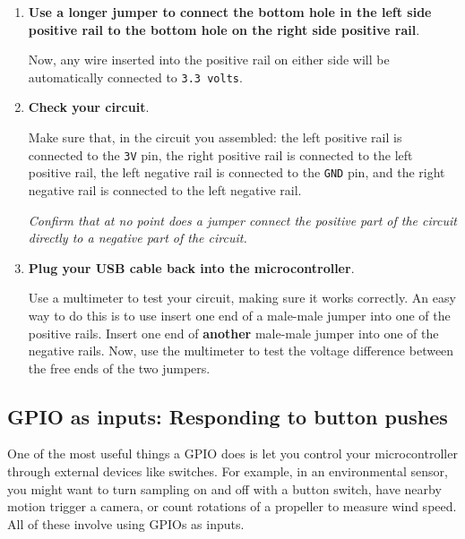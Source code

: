 \begin{enumerate}
	\item \textbf{Use a longer jumper to connect the bottom hole in the left side positive rail to the bottom hole on the right side positive rail}. 
	
	Now, any wire inserted into the positive rail on either side will be automatically connected to \texttt{3.3 volts}.
	
	\item \textbf{Check your circuit}.

	Make sure that, in the circuit you assembled: the left positive rail is connected to the \texttt{3V} pin, the right positive rail is connected to the left positive rail, the left negative rail is connected to the \texttt{GND} pin, and the right negative rail is connected to the left negative rail.
	
	\emph{Confirm that at no point does a jumper connect the positive part of the circuit directly to a negative part of the circuit.}

	\item \textbf{Plug your USB cable back into the microcontroller}.
	
	Use a multimeter to test your circuit, making sure it works correctly. 
	An easy way to do this is to use insert one end of a male-male jumper into one of the positive rails. 
	Insert one end of \textbf{another} male-male jumper into one of the negative rails. 
	Now, use the multimeter to test the voltage difference between the free ends of the two jumpers.
	
\end{enumerate}

\subsection{GPIO as inputs: Responding to button pushes}
One of the most useful things a GPIO does is let you control your microcontroller through external devices like switches. 
For example, in an environmental sensor, you might want to turn sampling on and off with a button switch, have nearby motion trigger a camera, or count rotations of a propeller to measure wind speed. All of these involve using GPIOs as inputs. 

